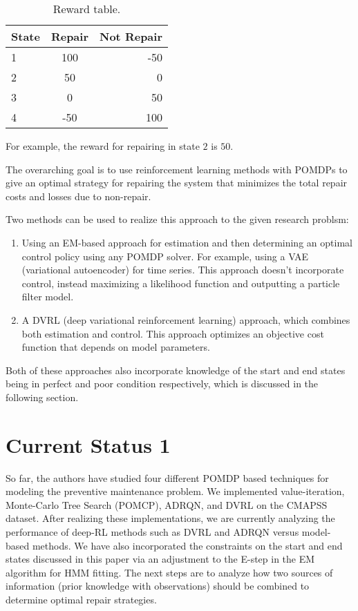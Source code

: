 \documentclass[english]{article}
\numberwithin{equation}{section}
\begin{document}
	 \begin{table}[h!]
	 	\begin{center}
	 		\caption{Reward table.}
	 		\label{tab:table1}
	 		\begin{tabular}{l|c|r} %
	 			\textbf{State} & \textbf{Repair} & \textbf{Not Repair}\\
	 			\hline
	 			1 & 100 & -50\\
	 			2 & 50 & 0\\
	 			3 & 0 & 50\\
	 			4 & -50 & 100
	 		\end{tabular}
	 	\end{center}
	 \end{table}
	 
	 For example, the reward for repairing in state $2$ is $50$.
	
	The overarching goal is to use reinforcement learning methods with POMDPs to give an optimal strategy for repairing the system that minimizes the total repair costs and losses due to non-repair.
	
	Two methods can be used to realize this approach to the given research problsm:
	\begin{enumerate}
		\item Using an EM-based approach for estimation and then determining an optimal control policy using any POMDP solver. For example, using a VAE (variational autoencoder) for time series. This approach doesn't incorporate control, instead maximizing a likelihood function and outputting a particle filter model.
		\item A DVRL (deep variational reinforcement learning) approach, which combines both estimation and control. This approach optimizes an objective cost function that depends on model parameters.
	\end{enumerate}
	
	Both of these approaches also incorporate knowledge of the start and end states being in perfect and poor condition respectively, which is discussed in the following section.
	
	\section*{Current Status 1}
	
	So far, the authors have studied four different POMDP based techniques for modeling the preventive maintenance problem. We implemented value-iteration, Monte-Carlo Tree Search (POMCP), ADRQN, and DVRL on the CMAPSS dataset. After realizing these implementations, we are currently analyzing the performance of deep-RL methods such as DVRL and ADRQN versus model-based methods. We have also incorporated the constraints on the start and end states discussed in this paper via an adjustment to the E-step in the EM algorithm for HMM fitting. The next steps are to analyze how two sources of information (prior knowledge with observations) should be combined to determine optimal repair strategies.
	
\end{document}
